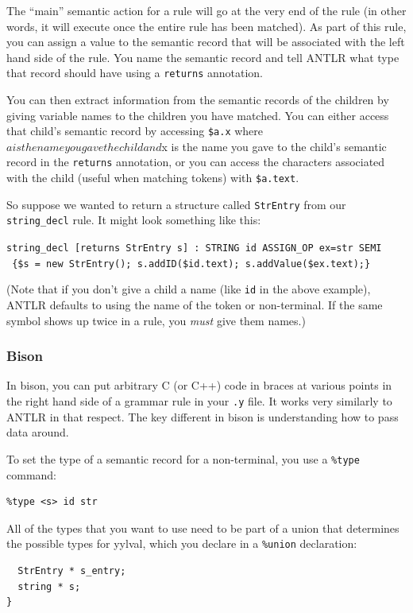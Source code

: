 \documentclass{article}
\begin{document}
The ``main'' semantic action for a rule will go at the very end of the rule (in other words, it will execute once the entire rule has been matched). As part of this rule, you can assign a value to the semantic record that will be associated with the left hand side of the rule. You name the semantic record and tell ANTLR what type that record should have using a \texttt{returns} annotation.

You can then extract information from the semantic records of the children by giving variable names to the children you have matched. You can either access that child's semantic record by accessing \texttt{\$a.x} where $a is the name you gave the child and $x is the name you gave to the child's semantic record in the \texttt{returns} annotation, or you can access the characters associated with the child (useful when matching tokens) with \texttt{\$a.text}.

So suppose we wanted to return a structure called \texttt{StrEntry} from our \texttt{string\_decl} rule. It might look something like this:

\texttt{string\_decl [returns StrEntry s] : STRING id ASSIGN\_OP ex=str SEMI} \\
\texttt{   \{\$s = new StrEntry(); s.addID(\$id.text); s.addValue(\$ex.text);\} }

(Note that if you don't give a child a name (like \texttt{id} in the above example), ANTLR defaults to using the name of the token or non-terminal. If the same symbol shows up twice in a rule, you {\em must} give them names.)

\subsubsection{Bison}
In bison, you can put arbitrary C (or C++) code in braces at various points in the right hand side of a grammar rule in your \texttt{.y} file. It works very similarly to ANTLR in that respect. The key different in bison is understanding how to pass data around.

To set the type of a semantic record for a non-terminal, you use a \texttt{\%type} command:

\begin{lstlisting}[numbers=none]
%type <s_entry> string_decl
%type <s> id str
\end{lstlisting}

All of the types that you want to use need to be part of a union that determines the possible types for yylval, which you declare in a \texttt{\%union} declaration:
\begin{lstlisting}[numbers=none]
%union{
  StrEntry * s_entry;
  string * s;
}
\end{lstlisting}
\end{document}
